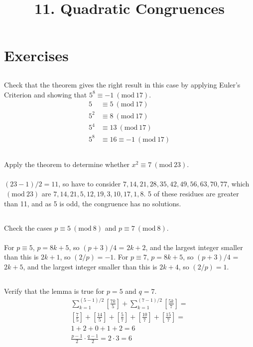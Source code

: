 \documentclass{article} \usepackage{amsmath}
\begin{document}
\newcommand{\Z}{\mathbb{Z}}
\newcommand{\s}{\sigma}
\newcommand{\p}{\phi}
\newcommand{\e}{\equiv}
\newcommand{\m}[1]{\ (\mathrm{mod}\ #1)}

\title{11. Quadratic Congruences}
\section{Exercises}

\subsection{}
Check that the theorem gives the right result in this case by applying
Euler's Criterion and showing that $5^8 \e -1 \m{17}$.
\begin{align*}
    5 &\e 5 \m{17}\\
    5^2 &\e 8 \m{17}\\
    5^4 &\e 13 \m{17}\\
    5^8 &\e 16 \e -1 \m{17}
\end{align*}

\subsection{}
Apply the theorem to determine whether $x^2 \e 7 \m{23}$.\\~\\
$(23 - 1)/2 = 11$, so have to consider $7, 14, 21, 28, 35, 42, 49, 56,
63, 70, 77$, which $\m{23}$ are $7, 14, 21, 5, 12, 19, 3, 10, 17, 1, 8$.
5 of these residues are greater than 11, and as 5 is odd, the congruence
has no solutions.

\subsection{}
Check the cases $p \e 5 \m{8}$ and $p \e 7 \m{8}$.\\~\\
For $p \e 5$, $p = 8k + 5$, so $(p + 3)/4$ = $2k + 2$, and the largest integer
smaller than this is $2k + 1$, so $(2/p) = -1$.
For $p \e 7$, $p = 8k + 5$, so $(p + 3)/4$ = $2k + 5$, and the largest integer
smaller than this is $2k + 4$, so $(2/p) = 1$.

\subsection{}
Verify that the lemma is true for $p = 5$ and $q = 7$.
\begin{gather*}
    \sum_{k=1}^{(5-1)/2}\left[\frac{7k}{5}\right] +
    \sum_{k=1}^{(7-1)/2}\left[\frac{5k}{7}\right] =\\
    \left[\frac{7}{5}\right] + \left[\frac{14}{5}\right] +
    \left[\frac{5}{7}\right] + \left[\frac{10}{7}\right] +
    \left[\frac{15}{7}\right] =\\
    1 + 2 + 0 + 1 + 2 = 6\\
    \frac{p-1}{2} \cdot \frac{q-1}{2} = 2 \cdot 3 = 6
\end{gather*}
\end{document}
